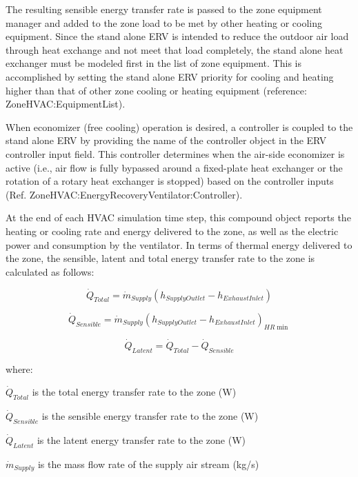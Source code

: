 The resulting sensible energy transfer rate is passed to the zone equipment manager and added to the zone load to be met by other heating or cooling equipment. Since the stand alone ERV is intended to reduce the outdoor air load through heat exchange and not meet that load completely, the stand alone heat exchanger must be modeled first in the list of zone equipment. This is accomplished by setting the stand alone ERV priority for cooling and heating higher than that of other zone cooling or heating equipment (reference: ZoneHVAC:EquipmentList).

When economizer (free cooling) operation is desired, a controller is coupled to the stand alone ERV by providing the name of the controller object in the ERV controller input field. This controller determines when the air-side economizer is active (i.e., air flow is fully bypassed around a fixed-plate heat exchanger or the rotation of a rotary heat exchanger is stopped) based on the controller inputs (Ref. ZoneHVAC:EnergyRecoveryVentilator:Controller).

At the end of each HVAC simulation time step, this compound object reports the heating or cooling rate and energy delivered to the zone, as well as the electric power and consumption by the ventilator. In terms of thermal energy delivered to the zone, the sensible, latent and total energy transfer rate to the zone is calculated as follows:

\begin{equation}
  \dot{Q}_{Total} = \dot{m}_{Supply} \left( h_{SupplyOutlet} - h_{ExhaustInlet} \right)
\end{equation}

\begin{equation}
  \dot{Q}_{Sensible} = \dot{m}_{Supply} \left( h_{SupplyOutlet} - h_{ExhaustInlet} \right)_{HR\min }
\end{equation}

\begin{equation}
  \dot{Q}_{Latent} = \dot{Q}_{Total} - \dot{Q}_{Sensible}
\end{equation}

where:

\(\dot{Q}_{Total}\) is the total energy transfer rate to the zone (W)

\(\dot{Q}_{Sensible}\) is the sensible energy transfer rate to the zone (W)

\(\dot{Q}_{Latent}\) is the latent energy transfer rate to the zone (W)

\(\dot{m}_{Supply}\) is the mass flow rate of the supply air stream (kg/s)

